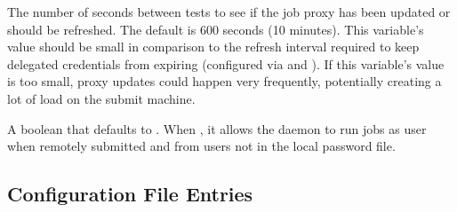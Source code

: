 \begin{description}
\label{param:ShadowCheckproxyInterval}
\item[\Macro{SHADOW\_CHECKPROXY\_INTERVAL}]
  The number of seconds between tests to see if the job proxy has been
  updated or should be refreshed.  The default is 600 seconds (10 minutes).
  This variable's value should be small in comparison to the refresh interval
  required to keep delegated credentials from expiring 
  (configured via
   and
  ).  
  If this variable's value is too small, 
  proxy updates could happen very frequently, 
  potentially creating a lot of load on the submit machine.

\label{param:ShadowRunUnknownUserJobs}
\item[\Macro{SHADOW\_RUN\_UNKNOWN\_USER\_JOBS}]
  A boolean that defaults to .
  When , it allows the  daemon to run jobs 
  as user  when remotely submitted and from
  users not in the local password file.
\end{description}

\subsection{\label{sec:Starter-Config-File-Entries}
Configuration File Entries}


